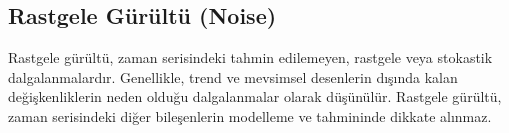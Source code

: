 \newpage

\subsection{Rastgele Gürültü (Noise)}
Rastgele gürültü, zaman serisindeki tahmin edilemeyen, rastgele veya stokastik dalgalanmalardır. Genellikle, trend ve mevsimsel desenlerin dışında kalan değişkenliklerin neden olduğu dalgalanmalar olarak düşünülür. Rastgele gürültü, zaman serisindeki diğer bileşenlerin modelleme ve tahmininde dikkate alınmaz.

\newpage